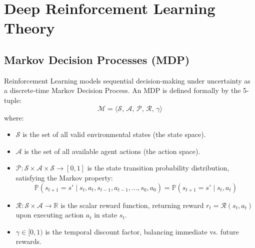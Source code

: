 \section{Deep Reinforcement Learning Theory}

\subsection{Markov Decision Processes (MDP)}
Reinforcement Learning models sequential decision-making under uncertainty as a discrete-time Markov Decision Process. An MDP is defined formally by the 5-tuple:
\begin{equation}
    \mathcal{M} = \langle \mathcal{S}, \, \mathcal{A}, \, \mathcal{P}, \, \mathcal{R}, \, \gamma \rangle
\end{equation}
where:
\begin{itemize}
    \item $\mathcal{S}$ is the set of all valid environmental states (the state space).
    \item $\mathcal{A}$ is the set of all available agent actions (the action space).
    \item $\mathcal{P}: \mathcal{S} \times \mathcal{A} \times \mathcal{S} \to [0, 1]$ is the state transition probability distribution, satisfying the Markov property:
    \begin{equation}
        \mathbb{P}(s_{t+1} = s' \mid s_t, a_t, s_{t-1}, a_{t-1}, \dots, s_0, a_0) = \mathbb{P}(s_{t+1} = s' \mid s_t, a_t)
    \end{equation}
    \item $\mathcal{R}: \mathcal{S} \times \mathcal{A} \to \mathbb{R}$ is the scalar reward function, returning reward $r_t = \mathcal{R}(s_t, a_t)$ upon executing action $a_t$ in state $s_t$.
    \item $\gamma \in [0, 1)$ is the temporal discount factor, balancing immediate vs. future rewards.
\end{itemize}

